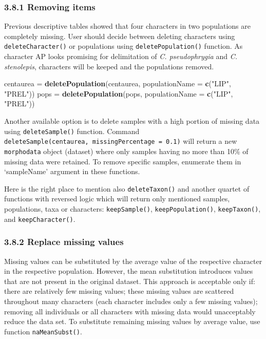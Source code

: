 \documentclass[
]{article}
\newenvironment{Shaded}{\begin{snugshade}}{\end{snugshade}}
\newcommand{\DataTypeTok}[1]{\textcolor[rgb]{0.13,0.29,0.53}{#1}}
\newcommand{\KeywordTok}[1]{\textcolor[rgb]{0.13,0.29,0.53}{\textbf{#1}}}
\newcommand{\NormalTok}[1]{#1}
\newcommand{\StringTok}[1]{\textcolor[rgb]{0.31,0.60,0.02}{#1}}
\begin{document}
\hypertarget{removing-items}{%
\subsubsection{3.8.1 Removing items}\label{removing-items}}

Previous descriptive tables showed that four characters in two
populations are completely missing. User should decide between deleting
characters using \texttt{deleteCharacter()} or populations using
\texttt{deletePopulation()} function. As character AP looks promising
for delimitation of \emph{C. pseudophrygia} and \emph{C. stenolepis},
characters will be keeped and the populations removed.

\begin{Shaded}
\begin{Highlighting}[]
\NormalTok{centaurea =}\StringTok{ }\KeywordTok{deletePopulation}\NormalTok{(centaurea, }\DataTypeTok{populationName =} \KeywordTok{c}\NormalTok{(}\StringTok{"LIP"}\NormalTok{, }\StringTok{"PREL"}\NormalTok{))}
\NormalTok{pops =}\StringTok{ }\KeywordTok{deletePopulation}\NormalTok{(pops, }\DataTypeTok{populationName =} \KeywordTok{c}\NormalTok{(}\StringTok{"LIP"}\NormalTok{, }\StringTok{"PREL"}\NormalTok{))}
\end{Highlighting}
\end{Shaded}

Another available option is to delete samples with a high portion of
missing data using \texttt{deleteSample()} function. Command
\texttt{deleteSample(centaurea,\ missingPercentage\ =\ 0.1)} will return
a new \texttt{morphodata} object (dataset) where only samples having no
more than 10\% of missing data were retained. To remove specific
samples, enumerate them in `sampleName' argument in these functions.

Here is the right place to mention also \texttt{deleteTaxon()} and
another quartet of functions with reversed logic which will return only
mentioned samples, populations, taxa or characters:
\texttt{keepSample()}, \texttt{keepPopulation()}, \texttt{keepTaxon()},
and \texttt{keepCharacter()}.

\hypertarget{replace-missing-values}{%
\subsubsection{3.8.2 Replace missing
values}\label{replace-missing-values}}

Missing values can be substituted by the average value of the respective
character in the respective population. However, the mean substitution
introduces values that are not present in the original dataset. This
approach is acceptable only if: there are relatively few missing values;
these missing values are scattered throughout many characters (each
character includes only a few missing values); removing all individuals
or all characters with missing data would unacceptably reduce the data
set. To substitute remaining missing values by average value, use
function \texttt{naMeanSubst()}.
\end{document}
